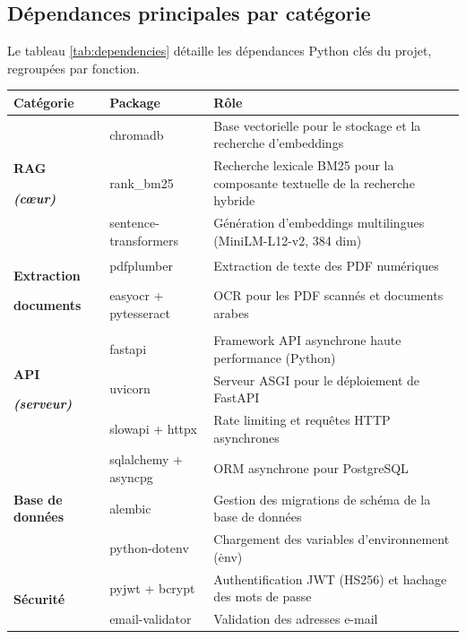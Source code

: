 \documentclass[12pt,a4paper,oneside]{report}
\begin{document}
\subsection{D\'{e}pendances principales par cat\'{e}gorie}

Le tableau \ref{tab:dependencies} d\'{e}taille les d\'{e}pendances Python cl\'{e}s du projet, regroup\'{e}es par fonction.

\begin{table}[htbp]
\centering
\small
\begin{tabular}{@{}p{3.2cm}p{3.5cm}p{5.5cm}@{}}
\toprule
\textbf{Cat\'{e}gorie} & \textbf{Package} & \textbf{R\^{o}le} \\
\midrule
\multirow{3}{3.2cm}{\textbf{RAG}\par\textbf{\textit{(c\oe{}ur)}}} & chromadb & Base vectorielle pour le stockage et la recherche d'embeddings \\
 & rank\_bm25 & Recherche lexicale BM25 pour la composante textuelle de la recherche hybride \\
 & sentence-transformers & G\'{e}n\'{e}ration d'embeddings multilingues (MiniLM-L12-v2, 384 dim) \\
\midrule
\multirow{2}{3.2cm}{\textbf{Extraction}\par\textbf{documents}} & pdfplumber & Extraction de texte des PDF num\'{e}riques \\
 & easyocr + pytesseract & OCR pour les PDF scann\'{e}s et documents arabes \\
\midrule
\multirow{3}{3.2cm}{\textbf{API}\par\textbf{\textit{(serveur)}}} & fastapi & Framework API asynchrone haute performance (Python) \\
 & uvicorn & Serveur ASGI pour le d\'{e}ploiement de FastAPI \\
 & slowapi + httpx & Rate limiting et requ\^{e}tes HTTP asynchrones \\
\midrule
\multirow{3}{3.2cm}{\textbf{Base de donn\'{e}es}} & sqlalchemy + asyncpg & ORM asynchrone pour PostgreSQL \\
 & alembic & Gestion des migrations de sch\'{e}ma de la base de donn\'{e}es \\
 & python-dotenv & Chargement des variables d'environnement (\.env) \\
\midrule
\multirow{2}{3.2cm}{\textbf{S\'{e}curit\'{e}}} & pyjwt + bcrypt & Authentification JWT (HS256) et hachage des mots de passe \\
 & email-validator & Validation des adresses e-mail \\

\end{tabular}
\end{table}
\end{document}
